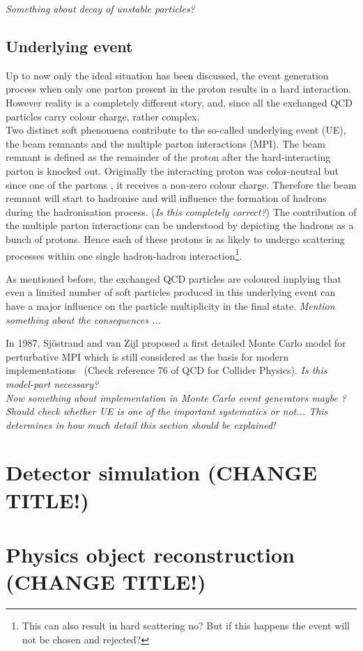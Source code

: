 \textit{Something about decay of unstable particles?}

\subsection{Underlying event}%
Up to now only the ideal situation has been discussed, the event generation process when only one parton present in the proton results in a hard interaction. However reality is a completely different story, and, since all the exchanged QCD particles carry colour charge, rather complex.\\
Two distinct soft phenomena contribute to the so-called underlying event (UE), the beam remnants and the multiple parton interactions (MPI). The beam remnant is defined as the remainder of the proton after the hard-interacting parton is knocked out. Originally the interacting proton was color-neutral but since one of the partons , it receives a non-zero colour charge. Therefore the beam remnant will start to hadronise and will influence the formation of hadrons during the hadronisation process. (\textit{Is this completely correct?}) The contribution of the multiple parton interactions can be understood by depicting the hadrons as a bunch of protons. Hence each of these protons is as likely to undergo scattering processes within one single hadron-hadron interaction\footnote{This can also result in hard scattering no? But if this happens the event will not be chosen and rejected?}.

As mentioned before, the exchanged QCD particles are coloured implying that even a limited number of soft particles produced in this underlying event can have a major influence on the particle multiplicity in the final state. 
\textit{Mention something about the consequences ...}

In 1987, Sj\"ostrand and van Zijl proposed a first detailed Monte Carlo model for perturbative MPI which is still considered as the basis for modern implementations~\cite{SjostrandAndZijl} (Check reference 76 of QCD for Collider Physics). \textit{Is this model-part necessary?}\\
\textit{Now something about implementation in Monte Carlo event generators maybe ?}\\

\textit{Should check whether UE is one of the important systematics or not... This determines in how much detail this section should be explained!}

\section{Detector simulation (CHANGE TITLE!)}

\section{Physics object reconstruction (CHANGE TITLE!)}

